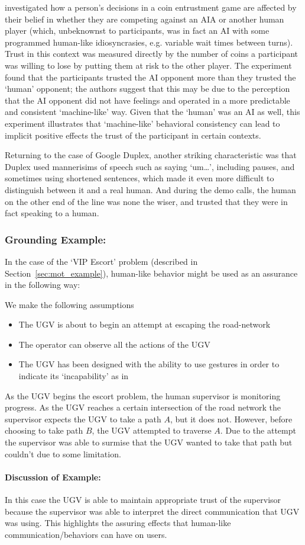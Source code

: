 \citet{Wu2016-ei} investigated how a person's decisions in a coin entrustment game are affected by their belief in whether they are competing against an AIA or another human player (which, unbeknownst to participants, was in fact an AI with some programmed human-like idiosyncrasies, e.g. variable wait times between turns). Trust in this context was measured directly by the number of coins a participant was willing to lose by putting them at risk to the other player. The experiment found that the participants trusted the AI opponent more than they trusted the `human' opponent; the authors suggest that this may be due to the perception that the AI opponent did not have feelings and operated in a more predictable and consistent `machine-like' way. Given that the `human' was an AI as well, this experiment illustrates that `machine-like' behavioral consistency can lead to implicit positive effects the trust of the participant in certain contexts.

Returning to the case of Google Duplex, another striking characteristic was that Duplex used mannerisims of speech such as saying `um\ldots', including pauses, and sometimes using shortened sentences, which made it even more difficult to distinguish between it and a real human. And during the demo calls, the human on the other end of the line was none the wiser, and trusted that they were in fact speaking to a human.

\subsubsection{Grounding Example:}
In the case of the `VIP Escort' problem (described in Section~\ref{sec:mot_example}), human-like behavior might be used as an assurance in the following way:

We make the following assumptions

\begin{itemize}
    \item The UGV is about to begin an attempt at escaping the road-network
    \item The operator can observe all the actions of the UGV
    \item The UGV has been designed with the ability to use gestures in order to indicate its `incapability' as in \cite{Kwon2018-xt}
\end{itemize}

As the UGV begins the escort problem, the human supervisor is monitoring progress. As the UGV reaches a certain intersection of the road network the supervisor expects the UGV to take a path $A$, but it does not. However, before choosing to take path $B$, the UGV attempted to traverse $A$. Due to the attempt the supervisor was able to surmise that the UGV wanted to take that path but couldn't due to some limitation.

\paragraph{\textbf{Discussion of Example:}} In this case the UGV is able to maintain appropriate trust of the supervisor because the supervisor was able to interpret the direct communication that UGV was using. This highlights the assuring effects that human-like communication/behaviors can have on users.
